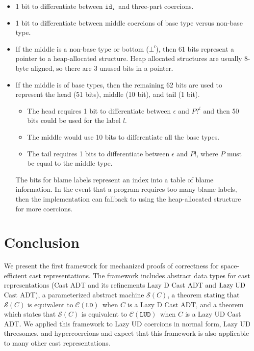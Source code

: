 \documentclass[runningheads]{llncs}
\newcommand{\LUD}{\ensuremath{\text{Lazy\;UD}}}
\newcommand{\CastADT}{\ensuremath{\text{Cast ADT}}}
\newcommand{\CMachine}[1]{\ensuremath{\mathcal{C}(#1)}}
\newcommand{\LDMachine}{\CMachine{\BLD}}
\newcommand{\LUDMachine}{\CMachine{\BLUD}}
\newcommand{\SMachine}[1]{\ensuremath{\mathcal{S}(#1)}}
\newcommand{\Tdyn}[0]{\ensuremath{\star}}
\newcommand{\BLD}[0]{\ensuremath{\mathtt{LD}}}
\newcommand{\BLUD}[0]{\ensuremath{\mathtt{LUD}}}
\newcommand{\cnfid}[1]{\ensuremath{\mathtt{id}_{#1}}}
\newcommand{\hcci}[0]{\cnfid{\Tdyn}}
\newcommand{\hche}[0]{\ensuremath{\epsilon}}
\newcommand{\hchp}[2]{\ensuremath{#1?^{#2}}}
\newcommand{\hcmfail}[1]{\ensuremath{\bot^l}}
\newcommand{\hcte}[0]{\ensuremath{\epsilon}}
\newcommand{\hcti}[1]{\ensuremath{#1!}}
\begin{document}
\begin{itemize}
\item 1 bit to differentiate between \hcci\ and three-part coercions.

\item 1 bit to differentiate between middle coercions of base type
versus non-base type.

\item If the middle is a non-base type or bottom ($\hcmfail{l}$), then 61 bits 
represent a
pointer to a heap-allocated structure. Heap allocated structures are
usually 8-byte aligned, so there are 3 unused bits in a pointer.

\item If the middle is of base types, then the remaining 62 bits are
used to represent the head (51 bits), middle (10 bit), and tail (1
bit).
\begin{itemize}
\item The head requires 1 bit to differentiate between $\hche$
and $\hchp{P}{l}$ and then 50 bits could be used for the label $l$.
\item The middle would use 10 bits to differentiate all the base types.
\item The tail requires 1 bits to differentiate between $\hcte$ and $\hcti{P}$, 
where $P$ must be equal to the middle type.
\end{itemize}
The bits for blame labels represent an index into a table of blame information.
In the event that a program requires too many blame labels, then the 
implementation
can fallback to using the heap-allocated structure for more
coercions.
\end{itemize}

\section{Conclusion} \label{sec:conclusion}

We present the first framework for mechanized proofs of correctness
for space-efficient cast representations.
%
The framework includes abstract data types for cast representations
(Cast ADT and its refinements Lazy D Cast ADT and \LUD\ \CastADT), a
parameterized abstract machine \SMachine{C}, a theorem stating that
\SMachine{C} is equivalent to \LDMachine\ when $C$ is a Lazy D Cast
ADT, and a theorem which states that \SMachine{C} is equivalent to
\LUDMachine\ when $C$ is a Lazy UD Cast ADT.
%
%
We applied this framework to Lazy UD coercions in normal form, Lazy UD
threesomes, and hypercoercions and expect that this framework is also
applicable to many other cast representations.
\end{document}
